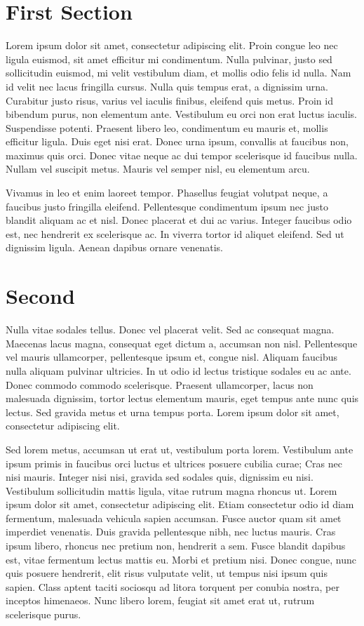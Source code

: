 \documentclass{article}
\begin{document}
    \begin{multicols}{2}
        \section{First Section}
        Lorem ipsum dolor sit amet, consectetur adipiscing elit. Proin congue leo nec ligula euismod, sit amet efficitur mi condimentum. Nulla pulvinar, justo sed sollicitudin euismod, mi velit vestibulum diam, et mollis odio felis id nulla. Nam id velit nec lacus fringilla cursus. Nulla quis tempus erat, a dignissim urna. Curabitur justo risus, varius vel iaculis finibus, eleifend quis metus. Proin id bibendum purus, non elementum ante. Vestibulum eu orci non erat luctus iaculis. Suspendisse potenti. Praesent libero leo, condimentum eu mauris et, mollis efficitur ligula. Duis eget nisi erat. Donec urna ipsum, convallis at faucibus non, maximus quis orci. Donec vitae neque ac dui tempor scelerisque id faucibus nulla. Nullam vel suscipit metus. Mauris vel semper nisl, eu elementum arcu.

        Vivamus in leo et enim laoreet tempor. Phasellus feugiat volutpat neque, a faucibus justo fringilla eleifend. Pellentesque condimentum ipsum nec justo blandit aliquam ac et nisl. Donec placerat et dui ac varius. Integer faucibus odio est, nec hendrerit ex scelerisque ac. In viverra tortor id aliquet eleifend. Sed ut dignissim ligula. Aenean dapibus ornare venenatis.

        \section{Second}
        Nulla vitae sodales tellus. Donec vel placerat velit. Sed ac consequat magna. Maecenas lacus magna, consequat eget dictum a, accumsan non nisl. Pellentesque vel mauris ullamcorper, pellentesque ipsum et, congue nisl. Aliquam faucibus nulla aliquam pulvinar ultricies. In ut odio id lectus tristique sodales eu ac ante. Donec commodo commodo scelerisque. Praesent ullamcorper, lacus non malesuada dignissim, tortor lectus elementum mauris, eget tempus ante nunc quis lectus. Sed gravida metus et urna tempus porta. Lorem ipsum dolor sit amet, consectetur adipiscing elit.

        Sed lorem metus, accumsan ut erat ut, vestibulum porta lorem. Vestibulum ante ipsum primis in faucibus orci luctus et ultrices posuere cubilia curae; Cras nec nisi mauris. Integer nisi nisi, gravida sed sodales quis, dignissim eu nisi. Vestibulum sollicitudin mattis ligula, vitae rutrum magna rhoncus ut. Lorem ipsum dolor sit amet, consectetur adipiscing elit. Etiam consectetur odio id diam fermentum, malesuada vehicula sapien accumsan. Fusce auctor quam sit amet imperdiet venenatis. Duis gravida pellentesque nibh, nec luctus mauris. Cras ipsum libero, rhoncus nec pretium non, hendrerit a sem. Fusce blandit dapibus est, vitae fermentum lectus mattis eu. Morbi et pretium nisi. Donec congue, nunc quis posuere hendrerit, elit risus vulputate velit, ut tempus nisi ipsum quis sapien. Class aptent taciti sociosqu ad litora torquent per conubia nostra, per inceptos himenaeos. Nunc libero lorem, feugiat sit amet erat ut, rutrum scelerisque purus.


\end{multicols}
\end{document}
